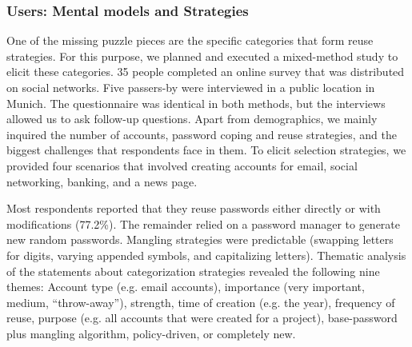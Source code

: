 \subsubsection{Users: Mental models and Strategies}
One of the missing puzzle pieces are the specific categories that form reuse strategies. For this purpose, we planned and executed a mixed-method study to elicit these categories. 35 people completed an online survey that was distributed on social networks. Five passers-by were interviewed in a public location in Munich. The questionnaire was identical in both methods, but the interviews allowed us to ask follow-up questions. Apart from demographics, we mainly inquired the number of accounts, password coping and reuse strategies, and the biggest challenges that respondents face in them. To elicit selection strategies, we provided four scenarios that involved creating accounts for email, social networking, banking, and a news page.

Most respondents reported that they reuse passwords either directly or with modifications (77.2\%). The remainder relied on a password manager to generate new random passwords. Mangling strategies were predictable (swapping letters for digits, varying appended symbols, and capitalizing letters). Thematic analysis of the statements about categorization strategies revealed the following nine themes: Account type (e.g. email accounts), importance (very important, medium, ``throw-away''), strength, time of creation (e.g. the year), frequency of reuse, purpose (e.g. all accounts that were created for a project), base-password plus mangling algorithm, policy-driven, or completely new.  


